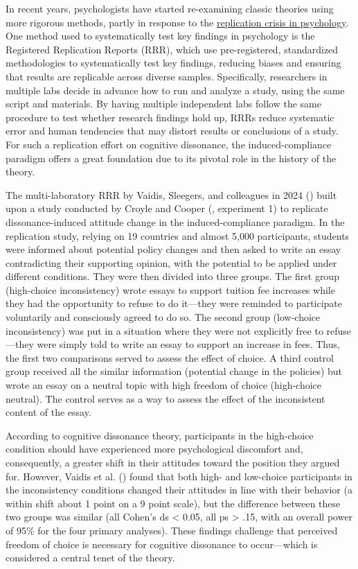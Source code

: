 \documentclass[
  letterpaper,
]{book}
\begin{document}
In recent years, psychologists have started re-examining classic
theories using more rigorous methods, partly in response to the
\href{intro.qmd}{replication crisis in psychology}. One method used to
systematically test key findings in psychology is the Registered
Replication Reports (RRR), which use pre-registered, standardized
methodologies to systematically test key findings, reducing biases and
ensuring that results are replicable across diverse samples.
Specifically, researchers in multiple labs decide in advance how to run
and analyze a study, using the same script and materials. By having
multiple independent labs follow the same procedure to test whether
research findings hold up, RRRs reduce systematic error and human
tendencies that may distort results or conclusions of a study. For such
a replication effort on cognitive dissonance, the induced-compliance
paradigm offers a great foundation due to its pivotal role in the
history of the theory.

The multi-laboratory RRR by Vaidis, Sleegers, and colleagues in 2024
() built upon a study conducted by Croyle and Cooper
(, experiment 1) to replicate
dissonance-induced attitude change in the induced-compliance paradigm.
In the replication study, relying on 19 countries and almost 5,000
participants, students were informed about potential policy changes and
then asked to write an essay contradicting their supporting opinion,
with the potential to be applied under different conditions. They were
then divided into three groups. The first group (high-choice
inconsistency) wrote essays to support tuition fee increases while they
had the opportunity to refuse to do it---they were reminded to
participate voluntarily and consciously agreed to do so. The second
group (low-choice inconsistency) was put in a situation where they were
not explicitly free to refuse---they were simply told to write an essay
to support an increase in fees. Thus, the first two comparisons served
to assess the effect of choice. A third control group received all the
similar information (potential change in the policies) but wrote an
essay on a neutral topic with high freedom of choice (high-choice
neutral). The control serves as a way to assess the effect of the
inconsistent content of the essay.

According to cognitive dissonance theory, participants in the
high-choice condition should have experienced more psychological
discomfort and, consequently, a greater shift in their attitudes toward
the position they argued for. However, Vaidis et al.
()
found that both high- and low-choice participants in the inconsistency
conditions changed their attitudes in line with their behavior (a within
shift about 1 point on a 9 point scale), but the difference between
these two groups was similar (all Cohen's ds \textless{} 0.05, all ps
\textgreater{} .15, with an overall power of 95\% for the four primary
analyses). These findings challenge that perceived freedom of choice is
necessary for cognitive dissonance to occur---which is considered a
central tenet of the theory.
\end{document}
